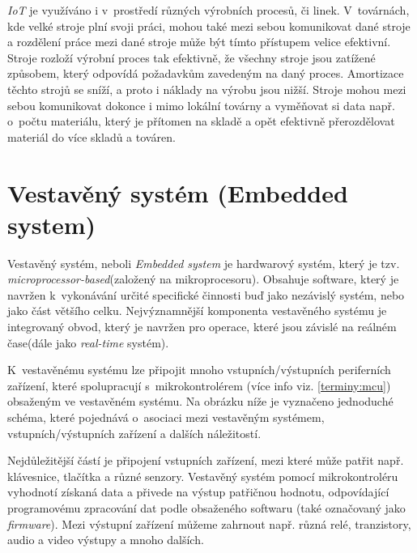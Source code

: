 \emph{IoT} je využíváno i v~prostředí různých výrobních procesů, či linek.
V~továrnách, kde velké stroje plní svoji práci, mohou také mezi sebou komunikovat dané stroje a rozdělení práce mezi dané stroje může být tímto přístupem velice efektivní.
Stroje rozloží výrobní proces tak efektivně, že všechny stroje jsou zatížené způsobem, který odpovídá požadavkům zavedeným na daný proces.
Amortizace těchto strojů se sníží, a proto i náklady na výrobu jsou nižší.
Stroje mohou mezi sebou komunikovat dokonce i mimo lokální továrny a vyměňovat si data např. o~počtu materiálu, který je přítomen na skladě a opět efektivně přerozdělovat materiál do více skladů a továren.

\newpage

\section{Vestavěný systém (Embedded system)}
\label{terminy:vestaveny}

Vestavěný systém, neboli \emph{Embedded system} je hardwarový systém, který je tzv. \emph{microprocessor-based}(založený na mikroprocesoru).
Obsahuje software, který je navržen k~vykonávání určité specifické činnosti buď jako nezávislý systém, nebo jako část většího celku.
Nejvýznamnější komponenta vestavěného systému je integrovaný obvod, který je navržen pro operace, které jsou závislé na reálném čase(dále jako \emph{real-time} systém).~\cite{embedded:info}

K~vestavěnému systému lze připojit mnoho vstupních/výstupních periferních zařízení, které spolupracují s~mikrokontrolérem (více info viz. \ref{terminy:mcu}) obsaženým ve vestavěném systému.
Na obrázku níže je vyznačeno jednoduché schéma, které pojednává o~asociaci mezi vestavěným systémem, vstupních/výstupních zařízení a dalších náležitostí.

Nejdůležitější částí je připojení vstupních zařízení, mezi které může patřit např. klávesnice, tlačítka a různé senzory.
Vestavěný systém pomocí mikrokontroléru vyhodnotí získaná data a přivede na výstup patřičnou hodnotu, odpovídající programovému zpracování dat podle obsaženého softwaru (také označovaný jako \emph{firmware}).
Mezi výstupní zařízení můžeme zahrnout např. různá relé, tranzistory, audio a video výstupy a mnoho dalších.

